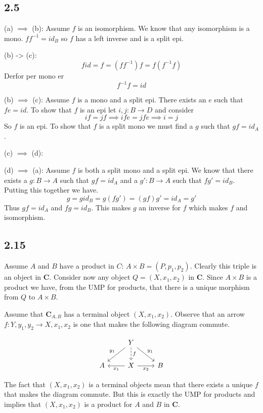 \documentclass{book}
\theoremstyle{definition}
\newcommand{\arr}[3]{#1 : #2 \rightarrow #3}
\newcommand\id{\mathit{id}}
\begin{document}
\subsection{2.5}

(a) $\implies$ (b): Assume $f$ is an isomorphism. We know that any isomorphism
is a mono. $f f^{-1} = \id_B$ so $f$ has a left inverse and is a split epi.

(b) -> (c): \[ f \id = f = (f f^{-1}) f = f (f^{-1} f)  \] Derfor per mono er
\[ f^{-1} f = \id \]

(b) $\implies$ (c): Assume $f$ is a mono and a split epi. There exists an $e$
such that $fe = \id$. To show that $f$ is an epi let $\arr{i, j}{B}{D}$ and
consider
\[
  if = jf \implies ife = jfe \implies i = j
\]
So $f$ is an epi. To show that $f$ is a split mono we must find a $g$ such that
$gf = id_A$.

(c) $\implies$ (d):

(d) $\implies$ (a): Assume $f$ is both a split mono and a split epi. We know
that there exists a $\arr{g}{B}{A}$ such that $gf = \id_A$ and a
$\arr{g'}{B}{A}$ such that $fg' = \id_B$. Putting this together we have.
\[
  g = g \id_B = g (f g') = (g f) g' = \id_A = g'
\]
Thus $gf = \id_A$ and $fg = \id_B$. This makes $g$ an inverse for $f$ which
makes $f$ and isomorphism.

\subsection{2.15}

Assume $A$ and $B$ have a product in $C$: $A \times B = (P, p_1, p_2)$. Clearly
this triple is an object in $\mathbf{C}$. Consider now any object $Q = (X, x_1,
x_2)$ in $\mathbf{C}$. Since $A \times B$ is a product we have, from the UMP for
products, that there is a unique morphism from $Q$ to $A \times B$.

Assume that $\mathbf{C}_{A, B}$ has a terminal object $(X, x_1, x_2)$. Observe
that an arrow $\arr{f}{Y, y_1, y_2}{X, x_1, x_2}$ is one that makes the
following diagram commute.

\[
  \begin{tikzcd}
    & Y \arrow[ld, "y_1"'] \arrow[d, dashrightarrow, "f"] \arrow[rd, "y_1"] \\
    A & X \arrow[l, "x_1"] \arrow[r, "x_2"'] & B
  \end{tikzcd}
\]

The fact that $(X, x_1, x_2)$ is a terminal objects mean that there exists a
unique $f$ that makes the diagram commute. But this is exactly the UMP for
products and implies that $(X, x_1, x_2)$ is a product for $A$ and $B$ in
$\mathbf{C}$.
\end{document}

